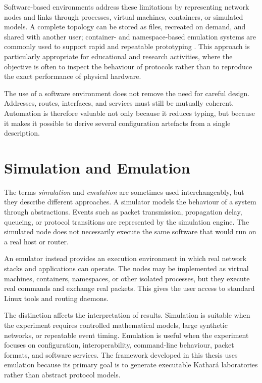 Software-based environments address these limitations by representing network
nodes and links through processes, virtual machines, containers, or simulated
models. A complete topology can be stored as files, recreated on demand, and
shared with another user; container- and namespace-based emulation systems are
commonly used to support rapid and repeatable prototyping
\cite{lantz2010network,scazzariello2020kathara}. This approach is particularly appropriate for
educational and research activities, where the objective is often to inspect
the behaviour of protocols rather than to reproduce the exact performance of
physical hardware.

The use of a software environment does not remove the need for careful design.
Addresses, routes, interfaces, and services must still be mutually coherent.
Automation is therefore valuable not only because it reduces typing, but
because it makes it possible to derive several configuration artefacts from a
single description.

\section{Simulation and Emulation}
\label{sec:simulation-emulation}

The terms \emph{simulation} and \emph{emulation} are sometimes used
interchangeably, but they describe different approaches. A simulator models
the behaviour of a system through abstractions. Events such as packet
transmission, propagation delay, queueing, or protocol transitions are
represented by the simulation engine. The simulated node does not necessarily
execute the same software that would run on a real host or router.

An emulator instead provides an execution environment in which real network
stacks and applications can operate. The nodes may be implemented as virtual
machines, containers, namespaces, or other isolated processes, but they
execute real commands and exchange real packets. This gives the user access to
standard Linux tools and routing daemons.

The distinction affects the interpretation of results. Simulation is suitable
when the experiment requires controlled mathematical models, large synthetic
networks, or repeatable event timing. Emulation is useful when the experiment
focuses on configuration, interoperability, command-line behaviour, packet
formats, and software services. The framework developed in this thesis uses
emulation because its primary goal is to generate executable Kathar\'a
laboratories rather than abstract protocol models.

